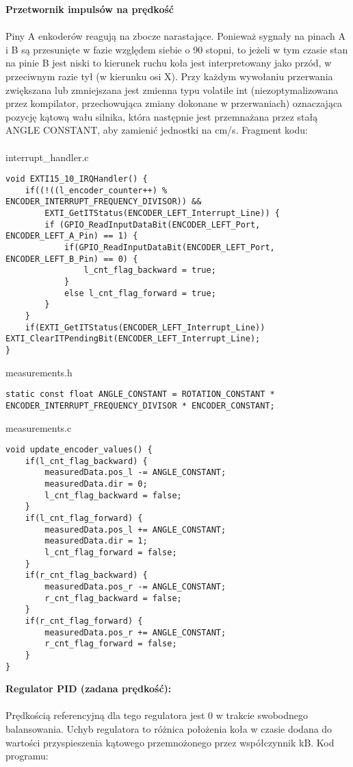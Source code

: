 \documentclass[a4paper,12pt,twoside,openany]{report}
\begin{document}
\newpage
\noindent \textbf{Przetwornik impulsów na prędkość}\\
\\
Piny A enkoderów reagują na zbocze narastające. Ponieważ sygnały na pinach A i B są przesunięte w fazie względem siebie o 90 stopni, to jeżeli w tym czasie stan na pinie B jest niski to kierunek ruchu koła jest interpretowany jako przód, w przeciwnym razie tył (w kierunku osi X). Przy każdym wywołaniu przerwania zwiększana lub zmniejszana jest zmienna typu volatile int (niezoptymalizowana przez kompilator, przechowująca zmiany dokonane w przerwaniach) oznaczająca pozycję kątową wału silnika, która następnie jest przemnażana przez stałą ANGLE CONSTANT, aby zamienić jednostki na cm/s. Fragment kodu:\\
\\
\noindent interrupt\_handler.c
\begin{lstlisting}[style=customc]
void EXTI15_10_IRQHandler() {
	if((!((l_encoder_counter++) % ENCODER_INTERRUPT_FREQUENCY_DIVISOR)) && 
        EXTI_GetITStatus(ENCODER_LEFT_Interrupt_Line)) {
		if (GPIO_ReadInputDataBit(ENCODER_LEFT_Port, ENCODER_LEFT_A_Pin) == 1) {
			if(GPIO_ReadInputDataBit(ENCODER_LEFT_Port, ENCODER_LEFT_B_Pin) == 0) {
            	l_cnt_flag_backward = true;
            }
			else l_cnt_flag_forward = true;
		}
	}
	if(EXTI_GetITStatus(ENCODER_LEFT_Interrupt_Line)) EXTI_ClearITPendingBit(ENCODER_LEFT_Interrupt_Line);
}
\end{lstlisting}
measurements.h
\begin{lstlisting}[style=customc]
static const float ANGLE_CONSTANT = ROTATION_CONSTANT * ENCODER_INTERRUPT_FREQUENCY_DIVISOR * ENCODER_CONSTANT;
\end{lstlisting}
measurements.c
\begin{lstlisting}[style=customc]
void update_encoder_values() {
	if(l_cnt_flag_backward) {
		measuredData.pos_l -= ANGLE_CONSTANT;
		measuredData.dir = 0;
		l_cnt_flag_backward = false;
	}
	if(l_cnt_flag_forward) {
		measuredData.pos_l += ANGLE_CONSTANT;
		measuredData.dir = 1;
		l_cnt_flag_forward = false;
	}
	if(r_cnt_flag_backward) {
		measuredData.pos_r -= ANGLE_CONSTANT;
		r_cnt_flag_backward = false;
	}
	if(r_cnt_flag_forward) {
		measuredData.pos_r += ANGLE_CONSTANT;
		r_cnt_flag_forward = false;
	}
}
\end{lstlisting}
\textbf{Regulator PID (zadana prędkość):}\\
\\
Prędkością referencyjną dla tego regulatora jest 0 w trakcie swobodnego balansowania. Uchyb regulatora to różnica położenia koła w czasie dodana do wartości przyspieszenia kątowego przemnożonego przez współczynnik kB. Kod programu:\\
\end{document}
